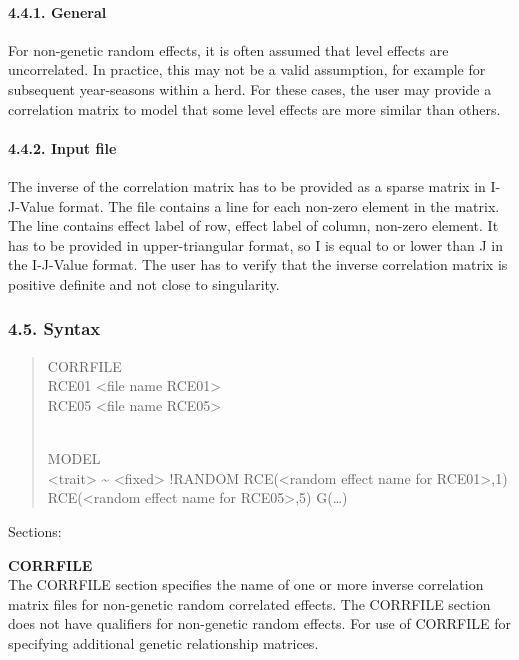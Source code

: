 \paragraph{4.4.1. General}\label{Obse29}

For non-genetic random effects, it is often assumed that level effects
are uncorrelated. In practice, this may not be a valid assumption, for
example for subsequent year-seasons within a herd. For these cases, the
user may provide a correlation matrix to model that some level effects
are more similar than others.

\paragraph{4.4.2. Input file}\label{Obse30}

The inverse of the correlation matrix has to be provided as a sparse
matrix in I-J-Value format. The file contains a line for each non-zero
element in the matrix. The line contains effect label of row, effect
label of column, non-zero element. It has to be provided in
upper-triangular format, so I is equal to or lower than J in the
I-J-Value format. The user has to verify that the inverse correlation
matrix is positive definite and not close to singularity.

\subsubsection{4.5. Syntax}\label{Obse31}

\begin{quote}
CORRFILE\\
RCE01 \textless file name RCE01\textgreater{}\\
RCE05 \textless file name RCE05\textgreater{}\\
\strut \\
MODEL\\
\textless trait\textgreater{} \textasciitilde{}
\textless fixed\textgreater{} !RANDOM RCE(\textless random effect name
for RCE01\textgreater,1) RCE(\textless random effect name for
RCE05\textgreater,5) G(\ldots)
\end{quote}

Sections:

\textbf{CORRFILE}\\
The CORRFILE section specifies the name of one or more inverse
correlation matrix files for non-genetic random correlated effects. The
CORRFILE section does not have qualifiers for non-genetic random
effects. For use of CORRFILE for specifying additional genetic
relationship matrices.

